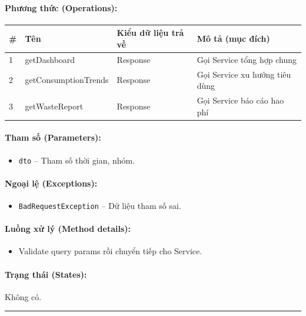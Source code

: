 \documentclass[12pt,a4paper]{article}
\begin{document}
\paragraph{Phương thức (Operations):}
\begin{longtable}{|p{0.6cm}|p{3.8cm}|p{2.6cm}|p{6.5cm}|}
\hline
\textbf{\#} & \textbf{Tên} & \textbf{Kiểu dữ liệu trả về} & \textbf{Mô tả (mục đích)} \\ \hline
\endhead
1 & getDashboard & Response & Gọi Service tổng hợp chung \\ \hline
2 & getConsumptionTrends & Response & Gọi Service xu hướng tiêu dùng \\ \hline
3 & getWasteReport & Response & Gọi Service báo cáo hao phí \\ \hline
\end{longtable}

\paragraph{Tham số (Parameters):}
\begin{itemize}[leftmargin=*]
    \item \texttt{dto} – Tham số thời gian, nhóm.
\end{itemize}


\paragraph{Ngoại lệ (Exceptions):}
\begin{itemize}[leftmargin=*]
    \item \texttt{BadRequestException} – Dữ liệu tham số sai.
\end{itemize}


\paragraph{Luồng xử lý (Method details):}
\begin{itemize}[leftmargin=*]
    \item Validate query params rồi chuyển tiếp cho Service.
\end{itemize}


\paragraph{Trạng thái (States):}
Không có.

\vskip 0.5cm
\noindent\rule{\textwidth}{0.5pt}
\vskip 0.5cm
\end{document}

